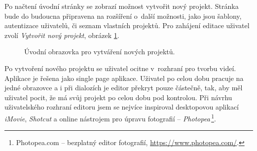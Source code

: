 Po načtení úvodní stránky se zobrazí možnost vytvořit nový projekt. Stránka bude do budoucna připravena na rozšíření o~další možnosti, jako jsou šablony, autentizace uživatelů, či seznam vlastních projektů. Pro zahájení editace uživatel zvolí \textit{Vytvořit nový projekt}, obrázek \ref{img:novy-projekt}.
\begin{figure}[h]
	\centering
	\caption{Úvodní obrazovka pro vytváření nových projektů.}\label{img:novy-projekt}
\end{figure}

Po vytvoření nového projektu se uživatel ocitne v~rozhraní pro tvorbu videí. Aplikace je řešena jako single page aplikace. Uživatel po celou dobu pracuje na jedné obrazovce a i při dialozích je editor překryt pouze částečně, tak, aby měl uživatel pocit, že má svůj projekt po celou dobu pod kontrolou. Při návrhu uživatelského rozhraní editoru jsem se nejvíce inspiroval desktopovou aplikací \textit{iMovie}, \textit{Shotcut} a online nástrojem pro úpravu fotografií -- \textit{Photopea}\,\footnote{Photopea.com -- bezplatný editor fotografií, \url{https://www.photopea.com/}.}.

